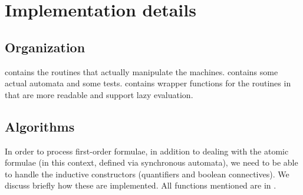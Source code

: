 \documentclass{hw}
\begin{document}
\section*{Implementation details}
\subsection*{Organization}
 contains the routines that actually manipulate the machines. 
contains some actual automata and some tests.  contains wrapper functions
for the routines in  that are more readable and support lazy evaluation.

\subsection*{Algorithms}
In order to process first-order formulae, in addition to dealing with the atomic
formulae (in this context, defined via synchronous automata), we need to be able
to handle the inductive constructors (quantifiers and boolean connectives). We
discuss briefly how these are implemented. All functions mentioned are in .
\end{document}
